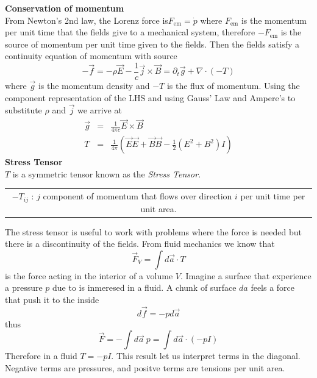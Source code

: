\documentclass[12pt,a4paper]{article}
\begin{document}
\textbf{Conservation of momentum}\\
From Newton's 2nd law, the Lorenz force is$F_{\text{em}} = \dot{p}$ where $F_{\text{em}}$ is  the momentum per unit time that the fields give to a mechanical system, therefore $-F_{\text{em}}$ is the source of momentum per unit time given to the fields. Then the fields satisfy a continuity equation of momentum with source
\begin{equation}
	-\vec{f} = -\rho \vec{E} - \frac{1}{c}\vec{j}\times \vec{B} = \partial_t \vec{g} + \nabla\cdot(-T)
\end{equation}
where $\vec{g}$ is the momentum density and $-T$ is the flux of momentum. Using the component representation of the LHS and using Gauss' Law and Ampere's to substitute $\rho$ and $\vec{j}$ we arrive at
\begin{eqnarray}
	\vec{g} & = & \frac{1}{4\pi c} \vec{E}\times \vec{B} \\
	T & = & \frac{1}{4\pi} \left(\vec{E}\vec{E}+\vec{B}\vec{B}-\frac{1}{2}(E^2 + B^2)I\right)
\end{eqnarray}
\textbf{Stress Tensor}\\
$T$ is a symmetric tensor known as the \textit{Stress Tensor}.

\begin{tabular}{c}
$-T_{ij}$ :  $j$ component of momentum that flows over direction $i$ per unit time per unit area.
\end{tabular}

The stress tensor is useful to work with problems where the force is needed but there is a discontinuity of the fields.
From fluid mechanics we know that
\begin{equation}
	\vec{F}_V = \int d\vec{a}\cdot T
\end{equation}
is the force acting in the interior of a volume $V$. Imagine a surface that experience a pressure $p$ due to is inmeresed in a fluid. A chunk of surface $da$ feels a force that push it to the inside
\begin{equation}
	d\vec{f} = - p d\vec{a}
\end{equation}
thus
\begin{equation}
	\vec{F} = -\int d\vec{a} \ p = \int d\vec{a} \cdot (-pI)
\end{equation}
Therefore in a fluid $T = -p I$. This result let us interpret terms in the diagonal. Negative terms are pressures, and positve terms are tensions per unit area.
\end{document}
